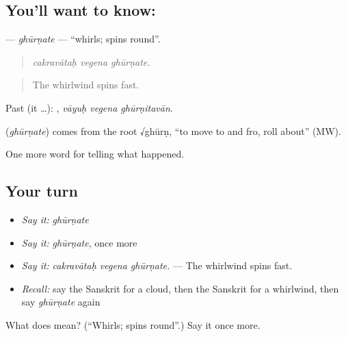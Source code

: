 \subsection*{You'll want to know: }
\textbf{} — \emph{ghūrṇate} — \textquotedblleft{}whirls; spins round\textquotedblright{}.

\begin{quote}
  
\end{quote}

\begin{quote}
\emph{cakravātaḥ vegena ghūrṇate.}
\end{quote}

\begin{quote}
The whirlwind spins fast.
\end{quote}

Past (it …):   , \emph{vāyuḥ vegena ghūrṇitavān}.

\begin{cousinweb}
\textbf{} (\emph{ghūrṇate}) comes from the root √ghūrṇ, \textquotedblleft{}to move to and fro, roll about\textquotedblright{} (MW).
\end{cousinweb}

\begin{grammarlens}[title={What you've built}]
One more word for telling what happened.
\end{grammarlens}

\subsection*{Your turn}
\begin{itemize}
\raggedright
  \item \emph{Say it:} \emph{ghūrṇate}
  \item \emph{Say it:} \emph{ghūrṇate}, once more
  \item \emph{Say it:} \emph{cakravātaḥ vegena ghūrṇate.} — The whirlwind spins fast.
  \item \emph{Recall:} say the Sanskrit for a cloud, then the Sanskrit for a whirlwind, then say \emph{ghūrṇate} again
\end{itemize}

\begin{tcolorbox}[breakable,colback=teal!4,colframe=teal!35!black,title={Before you move on}]
What does  mean? (\textquotedblleft{}Whirls; spins round\textquotedblright{}.) Say it once more.
\end{tcolorbox}
